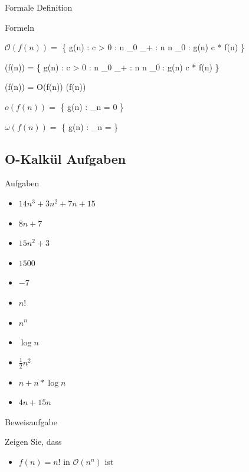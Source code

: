 \documentclass[18pt]{beamer}
\begin{document}
	\begin{frame}{Formale Definition}
				
		\begin{block} {Formeln}	
				\item $\mathcal{O}(f(n)) = $ \{ g(n) : \exists c >  0 : \exists  n _{0} \in {} _{+} : \all n \geq n _{0} : g(n) \leq c * f(n) \} \\
				\item \Omega(f(n)) = \{ g(n) : \exists c >  0 : \exists  n _{0} \in {} _{+} : \all n \geq n _{0} : g(n) \leq c * f(n) \}\\

				\item \Theta(f(n)) = O(f(n))   \cap   \Omega(f(n))
			
				\item $o(f(n)) = $ \{ g(n) : \lim _{n \to \infty}  = 0 \}

				\item $\omega(f(n)) = $ \{ g(n) : \lim _{n \to \infty}  = \infty \}

							
		\end{block}	

	\end{frame}

	\subsection{O-Kalkül Aufgaben}

	\begin{frame}{Aufgaben}
		\begin{itemize}
			\item $ 14 n ^{3} + 3 n ^{2}  + 7n + 15$
			\item $ 8 n + 7 $
			\item $ 15 n ^{2} + 3 $
			\item $ 1500 $
			\item $ -7 $
			\item $ n! $
			\item $ n ^{n} $
			\item $ \log{n} $
			\item $ \frac{1}{2} n ^{2} $
			\item $ n + n * \log{n} $
			\item $ 4 n + 15 n $	
		\end{itemize}	
	\end{frame}

	\begin{frame}{Beweisaufgabe}
		\begin{exampleblock}{Zeigen Sie, dass}
			\begin{itemize}
				\item $ f(n) =  n! $ in $ \mathcal{O} ( n ^{n}) $ ist
			\end{itemize}
		\end{exampleblock}
	\end{frame}
\end{document}
